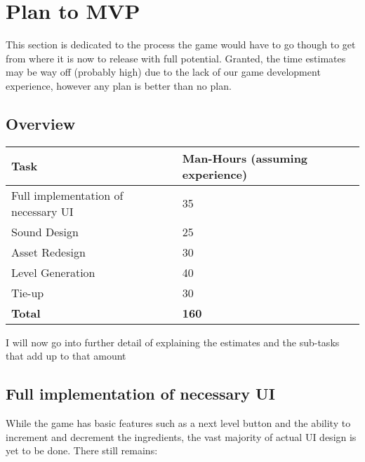 \documentclass{article}
\begin{document}
\section{Plan to MVP}

This section is dedicated to the process the game would have to go
though to get from where it is now to release with full
potential. Granted, the time estimates may be way off (probably high)
due to the lack of our game development experience, however any plan is
better than no plan.

\subsection{Overview}

\begin{table}[h]
\begin{tabular}{l|l}
\textbf{Task}                       & \textbf{Man-Hours (assuming experience)} \\ \hline
Full implementation of necessary UI & 35                                                 \\ \hline
Sound Design                        & 25                                                 \\ \hline
Asset Redesign                      & 30                                              \\ \hline
Level Generation                    & 40                                                 \\ \hline
Tie-up                              & 30                                               \\ \hline
\textbf{Total}                      & \textbf{160}                                              \\ 
\end{tabular}
\end{table}

I will now go into further detail of explaining the estimates and the
sub-tasks that add up to that amount

\subsection{Full implementation of necessary UI}

While the game has basic features such as a next level button and the
ability to increment and decrement the ingredients, the vast majority
of actual UI design is yet to be done. There still remains:
\end{document}
